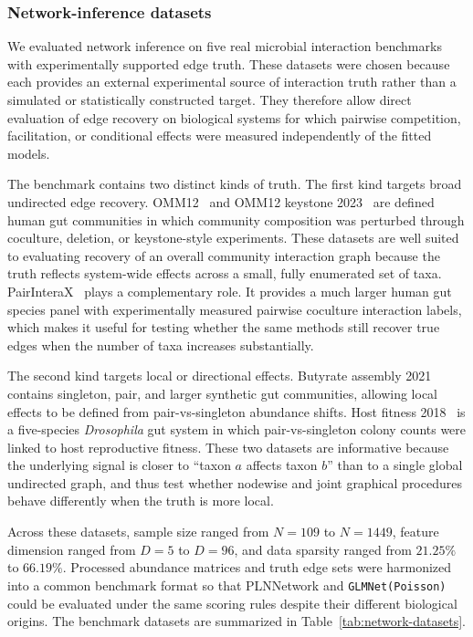 \documentclass{jmlr}
\begin{document}
\subsubsection{Network-inference datasets}
\label{subsubsec:network-inference-datasets}
We evaluated network inference on five real microbial interaction benchmarks with experimentally supported edge truth.
These datasets were chosen because each provides an external experimental source of interaction truth rather than a simulated or statistically constructed target.
They therefore allow direct evaluation of edge recovery on biological systems for which pairwise competition, facilitation, or conditional effects were measured independently of the fitted models.

The benchmark contains two distinct kinds of truth.
The first kind targets broad undirected edge recovery.
OMM12~\cite{Weiss2022OMM12} and OMM12 keystone 2023~\cite{Weiss2023Keystone} are defined human gut communities in which community composition was perturbed through coculture, deletion, or keystone-style experiments.
These datasets are well suited to evaluating recovery of an overall community interaction graph because the truth reflects system-wide effects across a small, fully enumerated set of taxa.
PairInteraX~\cite{Zhu2025PairInteraX} plays a complementary role.
It provides a much larger human gut species panel with experimentally measured pairwise coculture interaction labels, which makes it useful for testing whether the same methods still recover true edges when the number of taxa increases substantially.

The second kind targets local or directional effects.
Butyrate assembly 2021~\cite{Clark2021Butyrate} contains singleton, pair, and larger synthetic gut communities, allowing local effects to be defined from pair-vs-singleton abundance shifts.
Host fitness 2018~\cite{Gould2018HostFitness} is a five-species \textit{Drosophila} gut system in which pair-vs-singleton colony counts were linked to host reproductive fitness.
These two datasets are informative because the underlying signal is closer to ``taxon $a$ affects taxon $b$'' than to a single global undirected graph, and thus test whether nodewise and joint graphical procedures behave differently when the truth is more local.

Across these datasets, sample size ranged from $N=109$ to $N=1449$, feature dimension ranged from $D=5$ to $D=96$, and data sparsity ranged from $21.25\%$ to $66.19\%$.
Processed abundance matrices and truth edge sets were harmonized into a common benchmark format so that PLNNetwork and \texttt{GLMNet(Poisson)} could be evaluated under the same scoring rules despite their different biological origins.
The benchmark datasets are summarized in Table~\ref{tab:network-datasets}.
\end{document}
